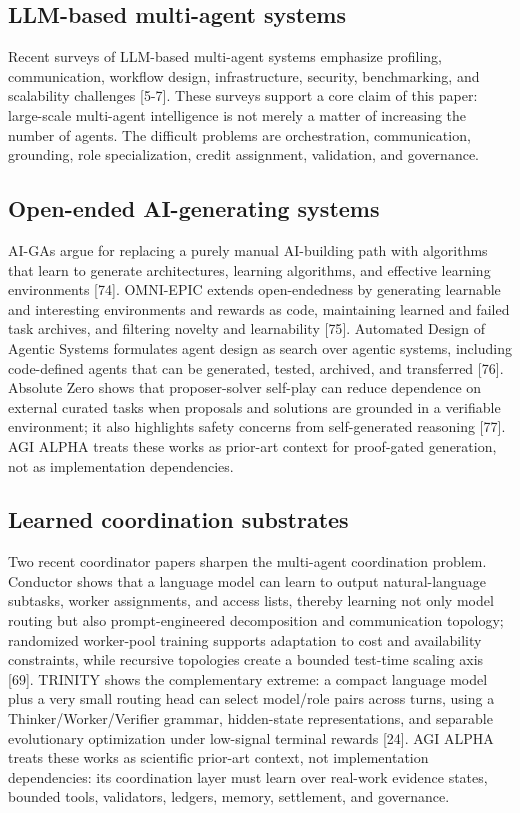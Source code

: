 \documentclass[
  11pt,
]{article}
\begin{document}
\subsection{LLM-based multi-agent
systems}\label{llm-based-multi-agent-systems}

Recent surveys of LLM-based multi-agent systems emphasize profiling,
communication, workflow design, infrastructure, security, benchmarking,
and scalability challenges {[}5-7{]}. These surveys support a core claim
of this paper: large-scale multi-agent intelligence is not merely a
matter of increasing the number of agents. The difficult problems are
orchestration, communication, grounding, role specialization, credit
assignment, validation, and governance.

\subsection{Open-ended AI-generating
systems}\label{open-ended-ai-generating-systems}

AI-GAs argue for replacing a purely manual AI-building path with
algorithms that learn to generate architectures, learning algorithms,
and effective learning environments {[}74{]}. OMNI-EPIC extends
open-endedness by generating learnable and interesting environments and
rewards as code, maintaining learned and failed task archives, and
filtering novelty and learnability {[}75{]}. Automated Design of Agentic
Systems formulates agent design as search over agentic systems,
including code-defined agents that can be generated, tested, archived,
and transferred {[}76{]}. Absolute Zero shows that proposer-solver
self-play can reduce dependence on external curated tasks when proposals
and solutions are grounded in a verifiable environment; it also
highlights safety concerns from self-generated reasoning {[}77{]}. AGI
ALPHA treats these works as prior-art context for proof-gated
generation, not as implementation dependencies.

\subsection{Learned coordination
substrates}\label{learned-coordination-substrates}

Two recent coordinator papers sharpen the multi-agent coordination
problem. Conductor shows that a language model can learn to output
natural-language subtasks, worker assignments, and access lists, thereby
learning not only model routing but also prompt-engineered decomposition
and communication topology; randomized worker-pool training supports
adaptation to cost and availability constraints, while recursive
topologies create a bounded test-time scaling axis {[}69{]}. TRINITY
shows the complementary extreme: a compact language model plus a very
small routing head can select model/role pairs across turns, using a
Thinker/Worker/Verifier grammar, hidden-state representations, and
separable evolutionary optimization under low-signal terminal rewards
{[}24{]}. AGI ALPHA treats these works as scientific prior-art context,
not implementation dependencies: its coordination layer must learn over
real-work evidence states, bounded tools, validators, ledgers, memory,
settlement, and governance.
\end{document}
